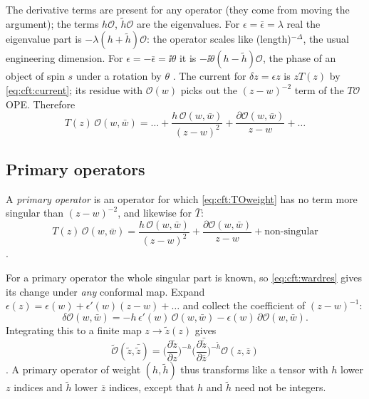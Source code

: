 The derivative terms are present for any operator (they come from moving the argument); the
terms $h\mathcal O$, $\tilde h\mathcal O$ are the eigenvalues. For $\epsilon=\bar\epsilon=\lambda$
real the eigenvalue part is $-\lambda(h+\tilde h)\mathcal O$: the operator scales like
(length)$^{-\Delta}$, the usual engineering dimension. For $\epsilon=-\bar\epsilon=\ii\theta$ it is
$-\ii\theta(h-\tilde h)\mathcal O$, the phase of an object of spin $s$ under a rotation by
$\theta$ . The current for $\delta z=\epsilon z$ is $zT(z)$ by
\eqref{eq:cft:current}; its residue with $\mathcal O(w)$ picks out the $(z-w)^{-2}$ term of the
$T\mathcal O$ OPE. Therefore
\begin{equation}\label{eq:cft:TOweight}
  T(z)\,\mathcal O(w,\bar w)=\dots+\frac{h\,\mathcal O(w,\bar w)}{(z-w)^2}
  +\frac{\partial\mathcal O(w,\bar w)}{z-w}+\dots
\end{equation}

\subsection{Primary operators}

\begin{definition}\label{def:cft:primary}
A \emph{primary operator} is an operator for which
\eqref{eq:cft:TOweight} has no term more singular than $(z-w)^{-2}$, and likewise for $\bar T$:
\begin{equation}\label{eq:cft:TOprimary}
  T(z)\,\mathcal O(w,\bar w)=\frac{h\,\mathcal O(w,\bar w)}{(z-w)^2}
  +\frac{\partial\mathcal O(w,\bar w)}{z-w}+\text{non-singular}
\end{equation}
.
\end{definition}

For a primary operator the whole singular part is known, so \eqref{eq:cft:wardres} gives its
change under \emph{any} conformal map. Expand $\epsilon(z)=\epsilon(w)+\epsilon'(w)(z-w)+\dots$
and collect the coefficient of $(z-w)^{-1}$:
\begin{equation}\label{eq:cft:deltaprimary}
  \delta\mathcal O(w,\bar w)=-h\,\epsilon'(w)\,\mathcal O(w,\bar w)-\epsilon(w)\,
   \partial\mathcal O(w,\bar w).
\end{equation}
Integrating this to a finite map $z\to\tilde z(z)$ gives
\begin{equation}\label{eq:cft:finiteprimary}
  \tilde{\mathcal O}(\tilde z,\bar{\tilde z})=
  \Big(\frac{\partial\tilde z}{\partial z}\Big)^{-h}
  \Big(\frac{\partial\bar{\tilde z}}{\partial\bar z}\Big)^{-\tilde h}\mathcal O(z,\bar z)
\end{equation}
. A primary operator of weight $(h,\tilde h)$ thus transforms
like a tensor with $h$ lower $z$ indices and $\tilde h$ lower $\bar z$ indices, except that $h$
and $\tilde h$ need not be integers.

